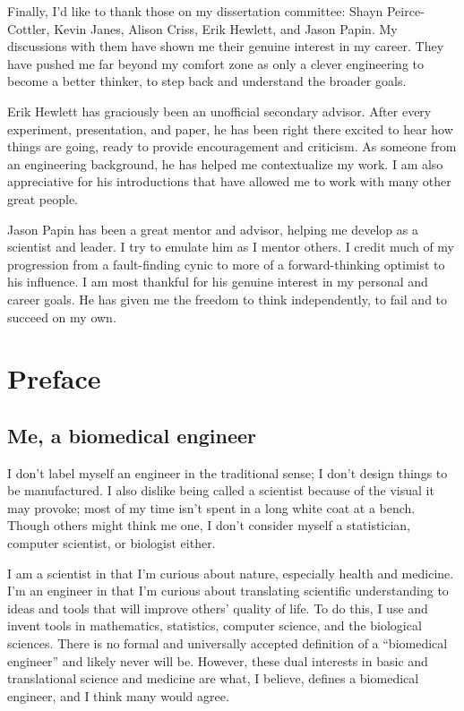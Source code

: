 Finally, I'd like to thank those on my dissertation committee:
Shayn Peirce-Cottler, Kevin Janes, Alison Criss, Erik Hewlett, and Jason Papin.
My discussions with them have shown me their genuine interest in my career.
They have pushed me far beyond my comfort zone as only
a clever engineering to become a better thinker, to step
back and understand the broader goals.

Erik Hewlett has graciously been an unofficial secondary advisor.
After every experiment, presentation, and paper, he has been right there
excited to hear how things are going, ready to provide encouragement and criticism.
As someone from an engineering background,
he has helped me contextualize my work.
I am also appreciative for 
his introductions that have allowed me to work with many other great people.

Jason Papin has been a great mentor and advisor, helping
me develop as a scientist and leader.
I try to emulate him as I mentor others.
I credit much of my progression from a fault-finding cynic to more of a  
forward-thinking optimist to his influence.
I am most thankful for his genuine interest in 
my personal and career goals. 
He has given me the freedom to think 
independently, to fail and to succeed on my own.


\chapter{Preface}

\section{Me, a biomedical engineer}

I don't label myself an engineer in the traditional sense; 
I don't design things to be manufactured. I also dislike 
being called a scientist because of the visual it may provoke; 
most of my time isn't spent in a long white coat at a 
bench. Though others might think me one, I don't consider 
myself a statistician, computer scientist, or biologist either.

I am a scientist in that I’m curious about nature, especially 
health and medicine. I’m an engineer in that I’m curious 
about translating scientific understanding to ideas and 
tools that will improve others' quality of life. To do 
this, I use and invent tools in mathematics, statistics, 
computer science, and the biological sciences. There is 
no formal and universally accepted definition of a 
``biomedical engineer'' and likely never will be. 
However, these dual interests in basic and translational
science and medicine are what, I believe, defines a 
biomedical engineer, and I think many would agree.


